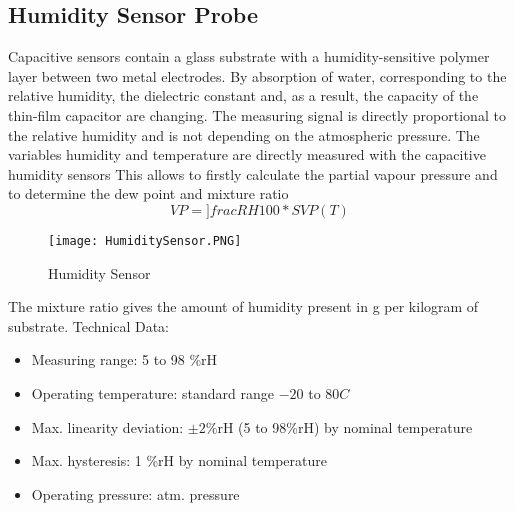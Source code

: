 \subsection{Humidity Sensor Probe}
Capacitive sensors contain a glass substrate with a humidity-sensitive polymer layer between two metal electrodes. By absorption of water, corresponding to the relative humidity, the dielectric constant and, as a result, the capacity of the thin-film capacitor are changing. The measuring signal is directly proportional to the relative humidity and is not depending on the atmospheric pressure. The variables humidity and temperature are directly measured with the capacitive humidity sensors This allows to firstly calculate the partial vapour pressure and to determine the dew point and mixture ratio
\begin{equation}
VP = ]frac{RH}{100}* SVP(T)
\label{VaporPressure}
\end{equation}
\begin{figure}[h!]
    \centering
        \texttt{[image: HumiditySensor.PNG]}
        \caption{Humidity Sensor}
    \label{f:HumiditySensor}
\end{figure}
The mixture ratio gives the amount of humidity present in g per kilogram of substrate.
Technical Data:
\begin{itemize}
  \item Measuring range: 5 to 98 \%rH
  \item Operating temperature: standard range $-20$ to $80 C$
  \item Max. linearity deviation: $ \pm 2\% $rH (5 to 98\%rH) by nominal temperature
  \item Max. hysteresis: 1 \%rH by nominal temperature
  \item Operating pressure: atm. pressure
\end{itemize}
